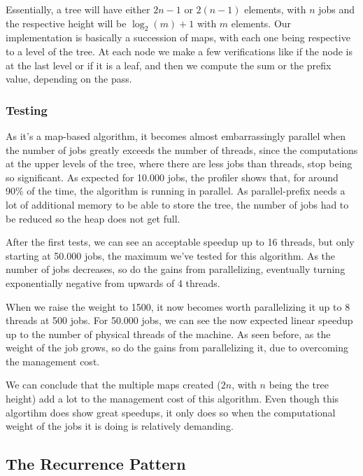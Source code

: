 \documentclass[10pt,journal]{IEEEtran}
\begin{document}
Essentially, a tree will have either $ 2n - 1 $ or $ 2(n - 1) $ elements, with $ n $ jobs and the respective height will be $ \log_2(m) + 1 $ with $ m $ elements. Our implementation is basically a succession of maps, with each one being respective to a level of the tree. At each node we make a few verifications like if the node is at the last level or if it is a leaf, and then we compute the sum or the prefix value, depending on the pass. 

\subsubsection{Testing}

As it's a map-based algorithm, it becomes almost embarrassingly parallel when the number of jobs greatly exceeds the number of threads, since the computations at the upper levels of the tree, where there are less jobs than threads, stop being so significant. As expected for 10.000 jobs, the profiler shows that, for around 90\% of the time, the algorithm is running in parallel. As parallel-prefix needs a lot of additional memory to be able to store the tree, the number of jobs had to be reduced so the heap does not get full. 

After the first tests, we can see an acceptable speedup up to 16 threads, but only starting at 50.000 jobs, the maximum we've tested for this algorithm. As the number of jobs decreases, so do the gains from parallelizing, eventually turning exponentially negative from upwards of 4 threads.

When we raise the weight to 1500, it now becomes worth parallelizing it up to 8 threads at 500 jobs. For 50.000 jobs, we can see the now expected linear speedup up to the number of physical threads of the machine. As seen before, as the weight of the job grows, so do the gains from parallelizing it, due to overcoming the management cost.

We can conclude that the multiple maps created ($ 2n $, with $ n $ being the tree height) add a lot to the management cost of this algorithm. Even though this algortihm does show great speedups, it only does so when the computational weight of the jobs it is doing is relatively demanding.

\subsection{The Recurrence Pattern}
\end{document}
